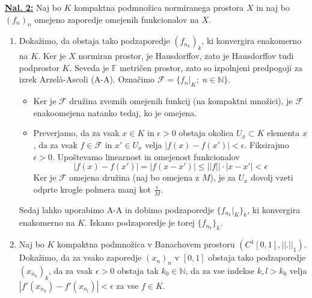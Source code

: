 \documentclass[a4paper, 12pt]{article}
\newcommand{\N}{\mathbb{N}}
\newcommand{\F}{\mathbb{F}}
\begin{document}
\underline{\textbf{Nal. 2:}}
Naj bo $K$ kompaktna podmnožica normiranega prostora $X$ in naj bo $(f_n)_n$ omejeno zaporedje omejenih funkcionalov na $X$.
\begin{enumerate}[label=(\alph*)]
	\item Dokažimo, da obstaja tako podzaporedje $(f_{n_k})_k$, ki konvergira enakomerno na $K$. Ker je $X$ normiran prostor, je Hausdorffov, zato je Hausdorffov tudi podprostor $K$. Seveda je $\F$ metričen prostor, zato so izpolnjeni predpogoji za izrek Arzel\`a-Ascoli (A-A). Označimo $\mathcal{F} = \lbrace f_n|_K ;\; n \in \N \rbrace$.
	\begin{itemize}
		\item Ker je $\mathcal{F}$ družina zveznih omejenih funkcij (na kompaktni množici), je $\mathcal{F}$ enakoomejena natanko tedaj, ko je omejena.
		\item Preverjamo, da za vsak $x \in K$ in $\epsilon > 0$ obstaja okolica $U_x \subset K$ elementa $x$, da za vsak $f \in \mathcal{F}$ in $x' \in U_x$ velja $| f(x) - f(x') | < \epsilon$. Fiksirajmo $\epsilon > 0$.
		Upoštevamo linearnost in omejenost funkcionalov
		\[
		|f(x) - f(x')| = |f(x - x')| \leq ||f||\cdot |x-x'| < \epsilon
		\]
		Ker je $\mathcal{F}$ omejena družina (naj bo omejena z $M$), je za $U_x$ dovolj vzeti odprte krogle polmera manj kot $\frac{\epsilon}{M}$.
	\end{itemize}
	Sedaj lahko uporabimo A-A in dobimo podzaporedje $\lbrace f_{n_k}|_K\rbrace_k$, ki konvergira enakomerno na $K$. Iskano podzaporedje je torej $\lbrace f_{n_k}\rbrace_k$.
	\item Naj bo $K$ kompaktna podmnožica v Banachovem prostoru $(C^1[0,1], ||.||_1)$. Dokažimo, da za vsako zaporedje $(x_n)_n$ v $[0,1]$ obstaja tako podzaporedje $(x_{n_k})_k$, da za vsak $\epsilon > 0$ obstaja tak $k_0 \in \N$, da za vse indekse $k, l > k_0$ velja $|f'(x_{n_k}) - f'(x_{n_l})| < \epsilon$ za vse $f \in K$.
	

\end{enumerate}
\end{document}
